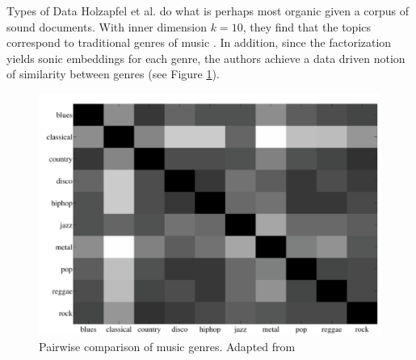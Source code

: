 \documentclass[12pt]{pom_thesis}
\begin{document}
\begin{chapter}{Types of Data}
Holzapfel et al. do what is perhaps most organic given a corpus of sound documents. With inner dimension $k=10$, they find that the topics correspond to traditional genres of music \cite{holzapfel2008musical}. In addition, since the factorization yields sonic embeddings for each genre, the authors achieve a data driven notion of similarity between genres  (see Figure \ref{fig:sound}). 
\begin{figure}[h]
	\label{fig:sound}
	\centering
	\includegraphics[width=12.2cm]{genre}
	\caption{Pairwise comparison of music genres. Adapted from \cite{holzapfel2008musical}}
\end{figure}

\end{chapter}
\end{document}
